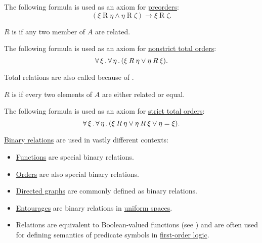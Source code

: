 \begin{definition}
\begin{thmenum}[resume=def:binary_relation]
    The following formula is used as an axiom for \hyperref[def:partially_ordered_set]{preorders}:
    \begin{equation}\label{eq:def:binary_relation/transitive}
      (\xi \mathbin{R} \eta \wedge \eta \mathbin{R} \zeta) \rightarrow \xi \mathbin{R} \zeta.
    \end{equation}

     \( R \) is  if any two member of \( A \) are related.

    The following formula is used as an axiom for \hyperref[def:totally_ordered_set]{nonstrict total orders}:
    \begin{equation}\label{eq:def:binary_relation/total}
      \forall \thinspace \xi \thinspace . \thinspace \forall \thinspace \eta \thinspace . \thinspace (\xi \mathbin{R} \eta \vee \eta \mathbin{R} \xi).
    \end{equation}

    Total relations are also called  because of .

     \( R \) is  if every two elements of \( A \) are either related or equal.

    The following formula is used as an axiom for \hyperref[def:totally_ordered_set]{strict total orders}:
    \begin{equation}\label{eq:def:binary_relation/trichotomic}
      \forall \thinspace \xi \thinspace . \thinspace \forall \thinspace \eta \thinspace . \thinspace (\xi \mathbin{R} \eta \vee \eta \mathbin{R} \xi \vee \eta = \xi).
    \end{equation}
  \end{thmenum}
\end{definition}

\begin{example}\label{ex:def:binary_relation}
  \hyperref[def:binary_relation]{Binary relations} are used in vastly different contexts:
  \begin{itemize}
    \item \hyperref[def:function]{Functions} are special binary relations.
    \item \hyperref[sec:order_theory]{Orders} are also special binary relations.
    \item \hyperref[def:quiver/simple]{Directed graphs} are commonly defined as binary relations.
    \item \hyperref[def:entourage]{Entourages} are binary relations in \hyperref[def:uniform_space]{uniform spaces}.
    \item Relations are equivalent to Boolean-valued functions (see ) and are often used for defining semantics of predicate symbols in \hyperref[subsec:first_order_logic]{first-order logic}.
  \end{itemize}
\end{example}


